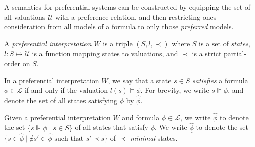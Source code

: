 A semantics for preferential systems can be constructed by equipping the set of all valuations $\mathcal{U}$ with a preference relation, and
then restricting ones consideration from all models of a formula to only those \textit{preferred} models.

\begin{definition}
  \label{definition:preferential-interpretation} A \emph{preferential interpretation} $W$ is a triple $(S, l, \prec)$ where $S$ is a set of
  \emph{states}, $l: S \mapsto \mathcal{U}$ is a function mapping states to valuations, and $\prec$ is a strict partial-order on $S$.
\end{definition}

\begin{definition}
  \label{definition:state-satisfaction} In a preferential interpretation $W$, we say that a state $s \in S$ \emph{satisfies} a formula $\phi
  \in \mathcal{L}$ if and only if the valuation $l(s) \vDash \phi$. For brevity, we write $s \VDash \phi$, and denote the set of all states
  satisfying $\phi$ by $\hat{\phi}$.
\end{definition}

\begin{definition}
  \label{definition:state-minimal} Given a preferential interpretation $W$ and formula $\phi \in \mathcal{L}$, we write $\hat{\phi}$ to
  denote the set $\{s \VDash \phi \mid s \in S\}$ of all states that satisfy $\phi$. We write $\underline{\hat{\phi}}$ to denote the set $\{s
  \in \hat{\phi}\mid \nexists s' \in \hat{\phi}\text{ such that }s' \prec s \}$ of $\prec$-\textit{minimal} states.
\end{definition}

